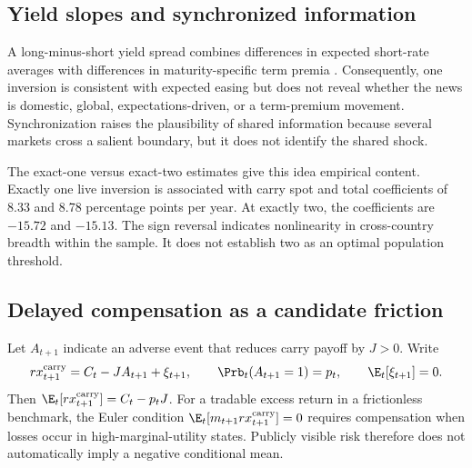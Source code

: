\subsection{Yield slopes and synchronized information}

A long-minus-short yield spread combines differences in expected short-rate averages with differences in maturity-specific term premia \citep{campbellShiller1991,hamiltonKim2002}. Consequently, one inversion is consistent with expected easing but does not reveal whether the news is domestic, global, expectations-driven, or a term-premium movement. Synchronization raises the plausibility of shared information because several markets cross a salient boundary, but it does not identify the shared shock.

The exact-one versus exact-two estimates give this idea empirical content. Exactly one live inversion is associated with carry spot and total coefficients of 8.33 and 8.78 percentage points per year. At exactly two, the coefficients are $-15.72$ and $-15.13$. The sign reversal indicates nonlinearity in cross-country breadth within the sample. It does not establish two as an optimal population threshold.

\subsection{Delayed compensation as a candidate friction}

Let $A_{t+1}$ indicate an adverse event that reduces carry payoff by $J>0$. Write
\begin{equation}
rx^{\mathrm{carry}}_{t+1}=C_t-JA_{t+1}+\xi_{t+1},
\qquad
\Prb_t(A_{t+1}=1)=p_t,
\qquad
\E_t[\xi_{t+1}]=0.
\label{eq:app-payoff}
\end{equation}
Then $\E_t[rx^{\mathrm{carry}}_{t+1}]=C_t-p_tJ$. For a tradable excess return in a frictionless benchmark, the Euler condition $\E_t[m_{t+1}rx^{\mathrm{carry}}_{t+1}]=0$ requires compensation when losses occur in high-marginal-utility states. Publicly visible risk therefore does not automatically imply a negative conditional mean.

